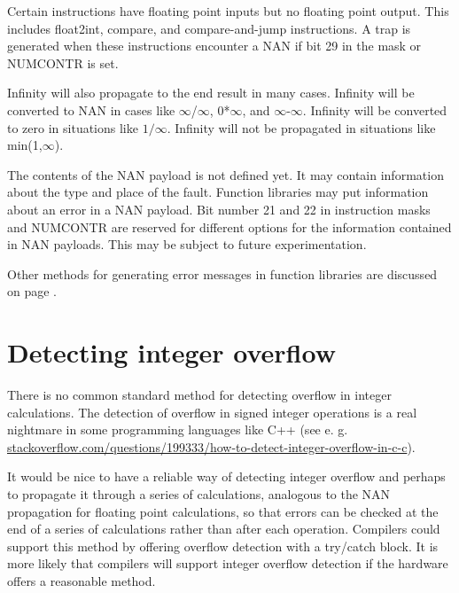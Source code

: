 \documentclass[forwardcom.tex]{subfiles}
\begin{document}
Certain instructions have floating point inputs but no floating point output. 
This includes float2int, compare, and compare-and-jump instructions.
A trap is generated when these instructions encounter a NAN if bit 29 in the mask or NUMCONTR is set.
\vspace{2mm}

Infinity will also propagate to the end result in many cases. 
Infinity will be converted to NAN in cases like $\infty$/$\infty$, 0*$\infty$, and $\infty$-$\infty$.
Infinity will be converted to zero in situations like $1/\infty$. Infinity will not be propagated in situations like min(1,$\infty$).
\vspace{2mm}

The contents of the NAN payload is not defined yet. It may contain information about the type and place of the fault. Function libraries may put information about an error in a NAN payload. Bit number 21 and 22 in instruction masks and NUMCONTR are reserved for different options for the information contained in NAN payloads. This may be subject to future experimentation.
\vspace{2mm}

Other methods for generating error messages in function libraries are discussed on page \pageref{errorMessageHandling}.
\vspace{2mm}


\section{Detecting integer overflow} 
\label{integerOverflowDetection}
There is no common standard method for detecting overflow in integer calculations. The detection of overflow in signed integer operations is a real nightmare in some programming languages like C++ (see e. g. 
\href{http://stackoverflow.com/questions/199333/how-to-detect-integer-overflow-in-c-c}{stackoverflow.com/questions/199333/how-to-detect-integer-overflow-in-c-c}).
\vspace{2mm}

It would be nice to have a reliable way of detecting integer overflow and perhaps to propagate it through a series of calculations, analogous to the NAN propagation for floating point calculations, so that errors can be checked at the end of a series of calculations rather than after each operation. Compilers could support this method by offering overflow detection with a try/catch block. It is more likely that compilers will support integer overflow detection if the hardware offers a reasonable method.
\vspace{2mm}
\end{document}
